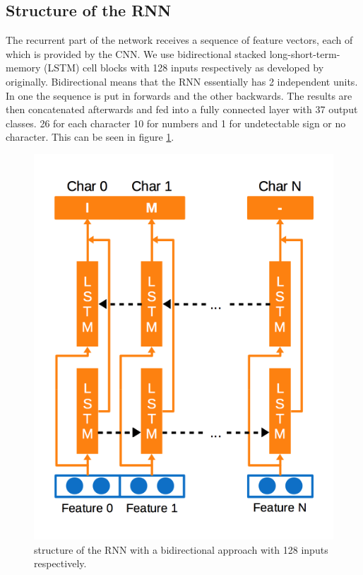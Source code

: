 \documentclass{utue} %
\begin{document}
\subsection{Structure of the RNN}
The recurrent part of the network receives a sequence of feature vectors, each of which is provided by the CNN. We use bidirectional stacked long-short-term-memory (LSTM) cell blocks with 128 inputs respectively as developed by ~\cite{Hochreiter:1997:LSM:1246443.1246450} originally. Bidirectional means that the RNN essentially has 2 independent units. In one the sequence is put in forwards and the other backwards. The results are then concatenated afterwards and fed into a fully connected layer with 37 output classes. 26 for each character 10 for numbers and 1 for undetectable sign or no character. This can be seen in figure \ref{fig:rnn_structure}. \\
\begin{figure}[h!]
	\centering
	\includegraphics[width=.9\columnwidth]{graphics/model_rnn.png}
	\caption{\label{fig:rnn_structure} \footnotesize{structure of the RNN with a bidirectional approach with 128 inputs respectively.}}
\end{figure}
\end{document}
